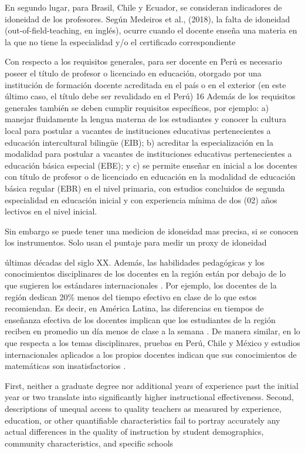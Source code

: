 \citep{Bertoni_et_al_2020a}
En segundo lugar, para Brasil, Chile y Ecuador, se consideran indicadores de idoneidad de los profesores. Según Medeiros et al., (2018), la falta de idoneidad (out-of-field-teaching, en inglés), ocurre cuando el docente enseña una materia en la que no tiene la especialidad y/o el certificado correspondiente

Con respecto a los requisitos generales, para ser docente en Perú es necesario poseer el título de profesor o licenciado en educación, otorgado por una institución de formación docente acreditada en el país o en el exterior (en este último caso, el título debe ser revalidado en el Perú) 16 Además de los requisitos generales también se deben cumplir requisitos específicos, por ejemplo: a) manejar fluidamente la lengua materna de los estudiantes y conocer la cultura local para postular a vacantes de instituciones educativas pertenecientes a educación intercultural bilingüe (EIB); b) acreditar la especialización en la modalidad para postular a vacantes de instituciones educativas pertenecientes a educación básica especial (EBE); y c) se permite enseñar en inicial a los docentes con título de profesor o de licenciado en educación en la modalidad de educación básica regular (EBR) en el nivel primaria, con estudios concluidos de segunda especialidad en educación inicial y con experiencia mínima de dos (02) años lectivos en el nivel inicial.

Sin embargo se puede tener una medicion de idoneidad mas precisa, si se conocen los instrumentos. Solo usan el puntaje para medir un proxy de idoneidad


últimas décadas del siglo XX. Además, las habilidades pedagógicas y los conocimientos disciplinares de los docentes en la región están por debajo de lo que sugieren los estándares internacionales \citep{Hincapie_et_al_2020}. Por ejemplo, los docentes de la región dedican 20\% menos del tiempo efectivo en clase de lo que estos recomiendan. Es decir, en América Latina, las diferencias en tiempos de enseñanza efectiva de los docentes implican que los estudiantes de la región reciben en promedio un día menos de clase a la semana \citep{Bruns_et_al_2015}. De manera similar, en lo que respecta a los temas disciplinares, pruebas en Perú, Chile y México y estudios internacionales aplicados a los propios docentes indican que sus conocimientos de matemáticas son insatisfactorios \citep{Elacqua_et_al_2018}.


First, neither a graduate degree nor additional years of experience past the initial year or two translate into significantly higher instructional effectiveness. Second, descriptions of unequal access to quality teachers as measured by experience, education, or other quantifiable characteristics fail to portray accurately any actual differences in the quality of instruction by student demographics, community characteristics, and specific schools \citep{Hanushek_et_al_2012}


